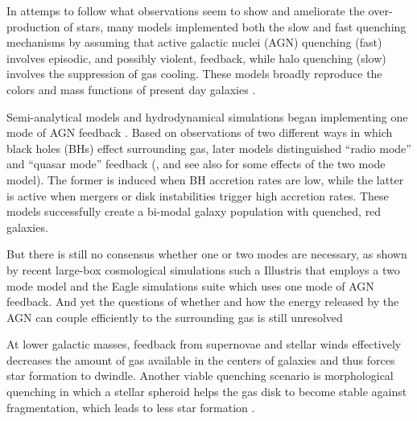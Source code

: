 \documentclass[useAMS,usenatbib]{mnras}
\begin{document}
%
{In attemps to follow what observations seem to show and ameliorate the
  over-production of stars, many models} implemented both the slow and fast
quenching mechanisms by assuming that active galactic nuclei (AGN) quenching (fast) involves
episodic, and possibly violent, feedback, while halo quenching (slow)
involves the suppression of gas cooling. These models broadly
reproduce the colors and mass functions of present day galaxies
\citep[e.g.][]{Croton2006, Cattaneo2006, Schaye2015}.

Semi-analytical models and hydrodynamical simulations began
implementing one mode of AGN feedback
\citep[e.g.][]{DiMatteo2005,Croton2006, Bower2006}.  Based on
observations of two different ways in which  black holes (BHs)  effect
surrounding gas, later models distinguished ``radio mode'' and ``quasar
mode'' feedback (\citealt{Sijacki2007, Somerville2008, Fanidakis2011},
and see also \citealt{Gutcke2015} for some effects of the two mode
model). The former is induced when BH accretion rates are low, while
the latter is active when mergers or disk instabilities trigger high
accretion rates. These models successfully create a bi-modal galaxy
population with quenched, red galaxies.

But there is still no consensus whether one or two modes are
necessary, as shown by recent large-box cosmological simulations such
a Illustris \citet{Vogelsberger2014} that employs a two mode model and
the Eagle simulations suite \citet{Schaye2015} which uses one mode of
AGN feedback.  And yet the questions of whether and how the energy
released by the AGN can couple efficiently to the surrounding gas is
still unresolved \citep[e.g. see][]{Cielo2014}
%

At lower galactic masses, feedback from supernovae and stellar winds
\citep[e.g.][]{DekelSilk1986, Murray2005, Stinson2013} effectively
decreases the amount of gas available in the centers of galaxies and
thus forces star formation to dwindle. 
Another viable quenching scenario is morphological quenching in which
a stellar spheroid helps the gas disk to become stable against
fragmentation, which leads to less star formation \citep{Martig2009,
  Martig2013, Genzel2014, Forbes2014}.
\end{document}
